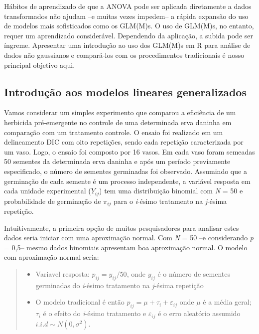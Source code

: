 \documentclass[
]{book}
\numberwithin{equation}{section}
\newcommand{\indt}[1]{\index{#1|ST}}
\begin{document}
Hábitos de aprendizado de que a ANOVA\indt{ANOVA} pode ser aplicada diretamente a dados transformados não ajudam --e muitas vezes impedem-- a rápida expansão do uso de modelos mais sofisticados como os GLM(M)s. O uso de GLM(M)s, no entanto, requer um aprendizado considerável. Dependendo da aplicação, a subida pode ser íngreme. Apresentar uma introdução ao uso dos GLM(M)s\indt{GLM(M)s} em R para análise de dados não gaussianos e compará-los com os procedimentos tradicionais é nosso principal objetivo aqui.

\hypertarget{introduuxe7uxe3o-aos-modelos-lineares-generalizados}{%
\subsection{Introdução aos modelos lineares generalizados}\label{introduuxe7uxe3o-aos-modelos-lineares-generalizados}}

Vamos considerar um simples experimento que comparou a eficiência de um herbicida pré-emergente no controle de uma determinada erva daninha em comparação com um tratamento controle. O ensaio foi realizado em um delineamento DIC com oito repetições, sendo cada repetição caracterizada por um vaso. Logo, o ensaio foi composto por 16 vasos. Em cada vaso foram semeadas 50 sementes da determinada erva daninha e após um período previamente especificado, o número de sementes germinadas foi observado. Assumindo que a germinação de cada semente é um processo independente, a variável resposta em cada unidade experimental (\(Y_{ij}\)) tem uma distribuição binomial com \emph{N} = 50 e probabilidade de germinação de \(\pi_{ij}\) para o \emph{i}-ésimo tratamento na \emph{j}-ésima repetição.

Intuitivamente, a primeira opção de muitos pesquisadores para analisar estes dados seria iniciar com uma aproximação normal. Com \emph{N} = 50 --e considerando \emph{p} = 0,5-- mesmo dados binomiais apresentam boa aproximação normal. O modelo com aproximação normal seria:

\begin{quote}
\begin{itemize}
\item
  Variavel resposta: \(p_{ij} = y_{ij}/50\), onde \(y_{ij}\) é o número de sementes germinadas do \emph{i}-ésimo tratamento na \emph{j}-ésima repetição
\item
  O modelo tradicional é então \(p_{ij} = \mu + \tau_i + \varepsilon_{ij}\) onde \(\mu\) é a média geral; \(\tau_i\) é o efeito do \emph{i}-ésimo tratamento e \(\varepsilon_{ij}\) é o erro aleatório assumido \(i.i.d \sim N(0, \sigma^2 )\).
\end{itemize}
\end{quote}
\end{document}
